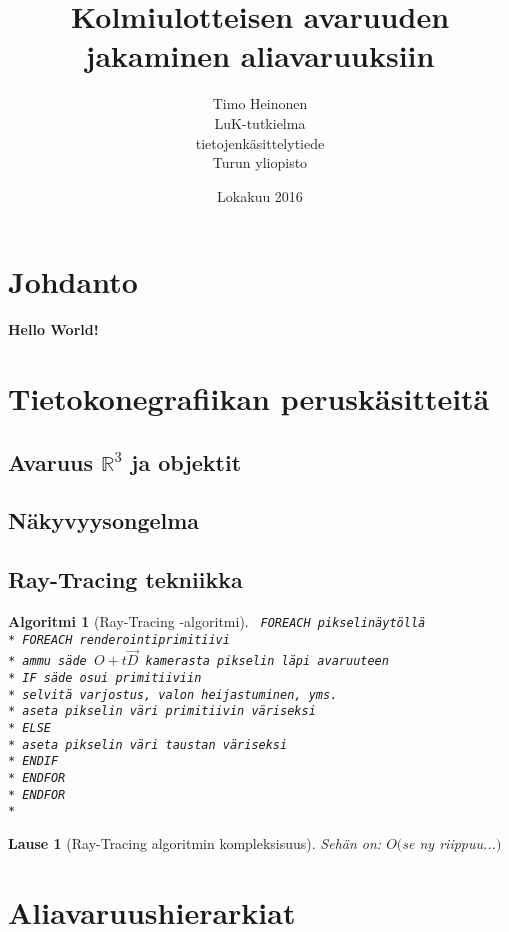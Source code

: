 \documentclass[a4paper,12pt, titlepage]{article}
\title{Kolmiulotteisen avaruuden jakaminen aliavaruuksiin}
\author{Timo Heinonen \\LuK-tutkielma \\ tietojenkäsittelytiede \\ Turun yliopisto}
\date{Lokakuu 2016}
\theoremstyle{break}
\newtheorem{lause}[maar]{Lause}
\theoremstyle{algostyle}
\newtheorem{alg}{Algoritmi}[section]
\newcommand{\R}{\mathbb{R}}
\newcommand{\tab}[1][1cm]{\hspace*{#1}} %
\newcommand{\code}[1]{\texttt{#1}} %
\begin{document}
\maketitle

\setcounter{tocdepth}{2} %
\tableofcontents

\newpage
\section{Johdanto}
\textbf{Hello World!}

\section{Tietokonegrafiikan peruskäsitteitä}
\subsection{Avaruus $\R ^3$ ja objektit} 
\subsection{Näkyvyysongelma}
\subsection{Ray-Tracing tekniikka}
\begin{alg}[Ray-Tracing -algoritmi]
\code{
FOREACH pikselinäytöllä \\*
\tab FOREACH renderointiprimitiivi \\*
\tab\tab ammu säde $O+t\vec{D}$ kamerasta pikselin läpi avaruuteen \\*
\tab\tab IF säde osui primitiiviin \\*
\tab\tab\tab selvitä varjostus, valon heijastuminen, yms. \\*
\tab\tab\tab aseta pikselin väri primitiivin väriseksi \\*
\tab\tab ELSE \\*
\tab\tab\tab aseta pikselin väri taustan väriseksi \\*
\tab\tab ENDIF \\*
\tab ENDFOR \\*
ENDFOR\\*}
\end{alg}

\begin{lause}[Ray-Tracing algoritmin kompleksisuus]
Sehän on: $O($se ny riippuu...$)$ 
\end{lause}

\section{Aliavaruushierarkiat}
\end{document}
